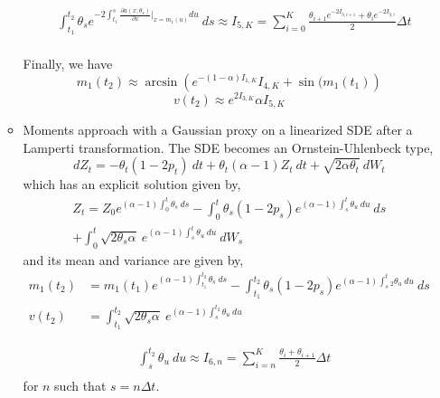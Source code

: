 \documentclass[a4paper, 12pt]{article}
\begin{document}
\begin{itemize}
\begin{itemize}
		\begin{equation*}
			\begin{split}
			& \int_{t_1}^{t_2} \theta_s e^{-2\int_{t_1}^{s} \frac{\partial a(x;\theta_s)}{\partial x}|_{x=m_1(u)} du } \ ds \approx I_{5,K}= \sum_{i=0}^K \frac{ \theta_{i+1}e^{-2 I_{3,i+1} } + \theta_{i}e^{-2 I_{3,i} } }{2} \Delta t \\
			\end{split}
		\end{equation*}

Finally, we have
		\begin{equation}
			m_{1}(t_2)  \approx \arcsin \left(   e^{-(1-\alpha)I_{1,K}} I_{4,K} +  \sin(m_{1}(t_1) \right)
	\end{equation}
	\begin{equation}
		v(t_2)  \approx e^{2I_{3,K}} \alpha I_{5,K}
\end{equation}

		\item Moments approach with a Gaussian proxy on a linearized SDE after a Lamperti transformation. The SDE becomes an Ornstein-Uhlenbeck  type,
		\begin{equation}
			dZ_t = - \theta_t (1-2p_t) \ dt + \theta_t(\alpha -1)  Z_t \ dt + \sqrt{2 \alpha \theta_t} \ dW_t
		\end{equation}
		which has an explicit solution given by,
		\begin{eqnarray*}
			Z_t = Z_0 e^{(\alpha-1)\int_0^t \theta_s \ ds } - \int_0^t \theta_s (1-2p_s) e^{(\alpha-1)\int_s^t \theta_u \ du } \ ds \\ + \int_0^t \sqrt{2 \theta_s \alpha} \ e^{(\alpha-1)\int_s^t \theta_u \ du } \ dW_s
	\end{eqnarray*}
	and its mean and variance are given by,
	\begin{align}
		m_1(t_2) &= m_1(t_1) e^{(\alpha-1)\int_{t_1}^{t_2} \theta_s \ ds } - \int_{t_1}^{t_2} \theta_s (1-2p_s) e^{(\alpha-1)\int_s^t_2 \theta_u \ du } \ ds\\
		v(t_2)&= \int_{t_1}^{t_2} \sqrt{2 \theta_s \alpha} \ e^{(\alpha-1)\int_s^{t_2} \theta_u \ du }
\end{align}

\begin{equation*}
	\begin{split}
	& \int_s^{t_2} \theta_u \ du \approx I_{6,n}= \sum_{i=n}^K \frac{ \theta_i + \theta_{i+1} }{2}\Delta t \\
	\end{split}
\end{equation*}
for $n$ such that $s=n \Delta t$.


\end{itemize}
\end{itemize}
\end{document}
